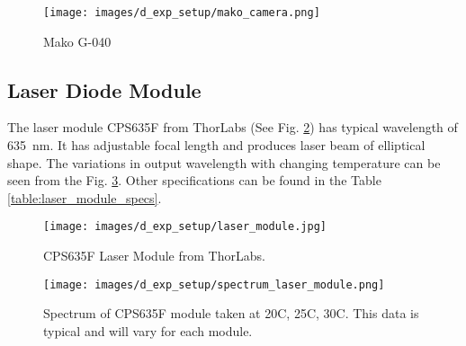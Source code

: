     \begin{figure}[h]
        \centering
        \texttt{[image: images/d\_exp\_setup/mako\_camera.png]}
        \caption{Mako G-040 \cite{mako_camera}}
        \label{fig:mako_camera.png}
    \end{figure}

\clearpage

\subsection{Laser Diode Module}
    The laser module CPS635F from ThorLabs (See Fig. \ref{fig:laser_module.jpg}) has typical wavelength of \SI{635}{\nano\meter}. It has adjustable focal length and produces laser beam of elliptical shape. The variations in output wavelength with changing temperature can be seen from the Fig. \ref{fig:spectrum_laser_module.png}. Other specifications can be found in the Table \ref{table:laser_module_specs}.

    \begin{figure}[h]
        \centering
        \texttt{[image: images/d\_exp\_setup/laser\_module.jpg]}
        \caption{CPS635F Laser Module from ThorLabs. \cite{thorlabs_laser}}
        \label{fig:laser_module.jpg}
    \end{figure}

    \begin{figure}[h]
        \centering
        \texttt{[image: images/d\_exp\_setup/spectrum\_laser\_module.png]}
        \caption{Spectrum of CPS635F module taken at 20\textdegree{}C, 25\textdegree{}C, 30\textdegree{}C. This data is typical and will vary for each module. \cite{thorlabs_laser}}
        \label{fig:spectrum_laser_module.png}
    \end{figure}

